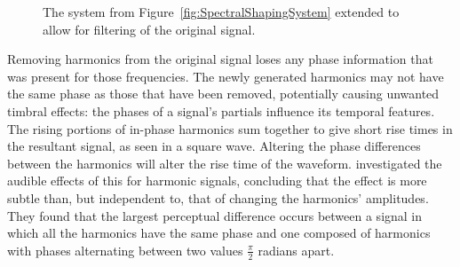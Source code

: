 \begin{figure}[h!]
			\caption{The system from Figure~\ref{fig:SpectralShapingSystem} extended to allow for filtering of
				 the original signal.}
			\label{fig:SuperpositionSystem}
		\end{figure}

		Removing harmonics from the original signal loses any phase information that was present for those
		frequencies. The newly generated harmonics may not have the same phase as those that have been removed,
		potentially causing unwanted timbral effects: the phases of a signal's partials influence its temporal
		features. The rising portions of in-phase harmonics sum together to give short rise times in the resultant
		signal, as seen in a square wave. Altering the phase differences between the harmonics will alter the rise
		time of the waveform. \citet{plomp1969effect} investigated the audible effects of this for harmonic
		signals, concluding that the effect is more subtle than, but independent to, that of changing the
		harmonics' amplitudes. They found that the largest perceptual difference occurs between a signal in which
		all the harmonics have the same phase and one composed of harmonics with phases alternating between two
		values $\frac{\pi}{2}$ radians apart.

